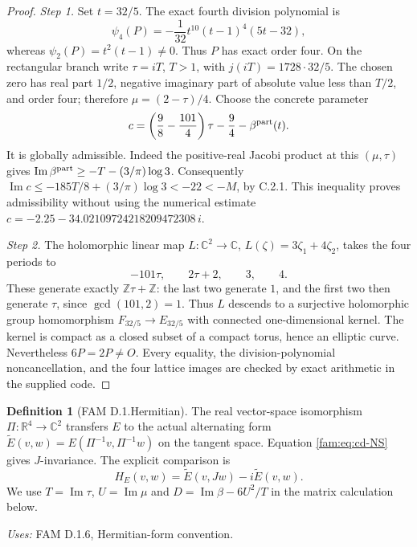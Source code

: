 \documentclass[11pt,a4paper]{article}
\theoremstyle{plain}
\theoremstyle{definition}
\newtheorem{definition}[theorem]{Definition}
\begin{document}
\begin{proof}
\par\noindent\textit{Step 1.} Set \(t=32/5\). The exact fourth division polynomial is
\[
 \psi_4(P)=-\frac1{32}t^{10}(t-1)^4(5t-32),
\]
whereas \(\psi_2(P)=t^2(t-1)\ne0\). Thus \(P\) has exact order four.
On the rectangular branch write \(\tau=iT\), \(T>1\), with
\(j(iT)=1728\cdot32/5\). The chosen zero has real part \(1/2\), negative
imaginary part of absolute value less than \(T/2\), and order four;
therefore \(\mu=(2-\tau)/4\). Choose the concrete parameter
\[
 c=\left(\frac98-\frac{101}{4}\right)\tau-\frac94
       -\beta^{\rm part}(t).
\]
It is globally admissible. Indeed the positive-real Jacobi product at this
\((\mu,\tau)\) gives
\(\operatorname{Im}\beta^{\rm part}\geq-T-(3/\pi)\log3\).
Consequently
\(\operatorname{Im}c\leq-185T/8+(3/\pi)\log3<-22<-M\), by C.2.1.
This inequality proves admissibility without using the numerical estimate
\(c=-2.25-34.02109724218209472308\,i\).

\par\noindent\textit{Step 2.} The holomorphic linear map \(L:\mathbb C^2\to\mathbb C\),
\(L(\zeta)=3\zeta_1+4\zeta_2\), takes the four periods to
\[
 -101\tau,\qquad2\tau+2,\qquad3,\qquad4.
\]
These generate exactly \(\mathbb Z\tau+\mathbb Z\): the last two generate
\(1\), and the first two then generate \(\tau\), since
\(\gcd(101,2)=1\). Thus \(L\) descends to a surjective holomorphic group
homomorphism \(F_{32/5}\to E_{32/5}\) with connected one-dimensional
kernel. The kernel is compact as a closed subset of a compact torus,
hence an elliptic curve. Nevertheless \(6P=2P\ne O\).
Every equality, the division-polynomial noncancellation, and the four
lattice images are checked by exact arithmetic in the supplied code.
\end{proof}

\begin{definition}[FAM D.1.Hermitian]\label{fam:D.1.Hermitian}
The real vector-space isomorphism
$\Pi:\mathbb R^4\to\mathbb C^2$ transfers $E$ to the actual alternating
form $\widetilde E(v,w)=E(\Pi^{-1}v,\Pi^{-1}w)$ on the tangent space.
Equation \eqref{fam:eq:cd-NS} gives $J$-invariance. The explicit comparison is
\[
 H_E(v,w)=\widetilde E(v,Jw)-i\widetilde E(v,w).
\] We use $T=\operatorname{Im}\tau$, $U=\operatorname{Im}\mu$ and $D=\operatorname{Im}\beta-6U^2/T$ in the matrix calculation below.
\end{definition}
\noindent\emph{Uses:} FAM D.1.6, Hermitian-form convention.\par
\end{document}
